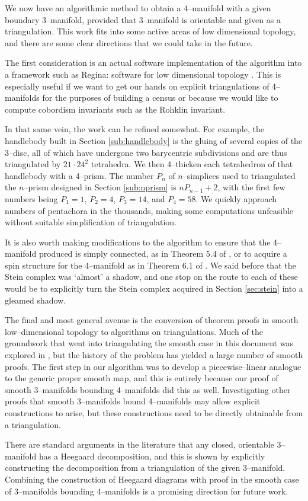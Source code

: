We now have an algorithmic method to obtain a 4--manifold with a given boundary 3--manifold, provided that 3--manifold is orientable and given as a triangulation.
This work fits into some active areas of low dimensional topology, and there are some clear directions that we could take in the future.

The first consideration is an actual software implementation of the algorithm into a framework such as Regina: software for low dimensional topology \cite{regina}.
This is especially useful if we want to get our hands on explicit triangulations of 4--manifolds for the purposes of building a census or because we would like to compute cobordism invariants such as the Rohklin invariant.

In that same vein, the work can be refined somewhat.
For example, the handlebody built in Section \ref{sub:handlebody} is the gluing of several copies of the 3--disc, all of which have undergone two barycentric subdivisions and are thus triangulated by $21\cdot 24^2$ tetrahedra.
We then 4--thicken each tetrahedron of that handlebody with a 4--prism.
The number $P_n$ of $n$--simplices used to triangulated the $n$--prism designed in Section \ref{sub:nprism} is  $nP_{n-1} +2$, with the first few numbers being $P_1=1$, $P_2=4$, $P_3=14$, and $P_4=58$.
We quickly approach numbers of pentachora in the thousands, making some computations unfeasible without suitable simplification of triangulation.

It is also worth making modifications to the algorithm to ensure that the 4--manifold produced is simply connected, as in Theorem 5.4 of \cite{CostThur08}, or to acquire a spin structure for the 4--manifold as in Theorem 6.1 of \cite{CostThur08}.
We said before that the Stein complex was `almost' a shadow, and one stop on the route to each of these would be to explicitly turn the Stein complex acquired in Section \ref{sec:stein} into a gleamed shadow.

The final and most general avenue is the conversion of theorem proofs in smooth low--dimensional topology to algorithms on triangulations.
Much of the groundwork that went into triangulating the smooth case in this document was explored in \cite{CostThur08}, but the history of the problem has yielded a large number of smooth proofs.
The first step in our algorithm was to develop a piecewise--linear analogue to the generic proper smooth map, and this is entirely because our proof of smooth 3--manifolds bounding 4--manifolds did this as well.
Investigating other proofs that smooth 3--manifolds bound 4--manifolds may allow explicit constructions to arise, but these constructions need to be directly obtainable from a triangulation.

There are standard arguments in the literature that any closed, orientable 3--manifold has a Heegaard decomposition, and this is shown by explicitly constructing the decomposition from a triangulation of the given 3--manifold.
Combining the construction of Heegaard diagrams with proof in the smooth case of 3--manifolds bounding 4--manifolds is a promising direction for future work.
